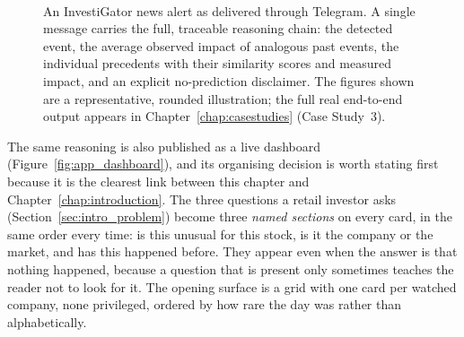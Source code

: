 \begin{figure}[ht]
\centering
\footnotesize
\setlength{\fboxsep}{6pt}%
\colorbox{black!4}{%
  \begin{minipage}{9.2cm}
    \colorbox{black!15}{}\\[5pt]
  \end{minipage}}
\normalsize
\caption[Telegram alert as received by the investor]{An InvestiGator news alert as delivered through Telegram.
A single message carries the full, traceable reasoning chain: the detected event, the average observed
impact of analogous past events, the individual precedents with their similarity scores and measured
impact, and an explicit no-prediction disclaimer. The figures shown are a representative, rounded
illustration; the full real end-to-end output appears in Chapter~\ref{chap:casestudies} (Case Study~3).}
\label{fig:telegram_mockup}
\end{figure}

The same reasoning is also published as a live dashboard (Figure~\ref{fig:app_dashboard}), and its
organising decision is worth stating first because it is the clearest link between this chapter and
Chapter~\ref{chap:introduction}. The three questions a retail investor asks
(Section~\ref{sec:intro_problem}) become three \emph{named sections} on every card, in the same
order every time: is this unusual for this stock, is it the company or the market, and has this
happened before. They appear even when the answer is that nothing happened, because a question that
is present only sometimes teaches the reader not to look for it. The opening surface is a grid with
one card per watched company, none privileged, ordered by how rare the day was rather than
alphabetically.

